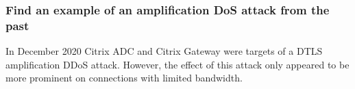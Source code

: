 \documentclass{report}
\begin{document}
			\subsubsection{Find an example of an amplification DoS attack from the past}
			\startsubsection
				In December 2020 Citrix ADC and Citrix Gateway were targets of a DTLS amplification DDoS attack. However, the effect of this attack only appeared to be more prominent on connections with limited bandwidth.
			\closesection
		\closesection
	\closesection
\end{document}
